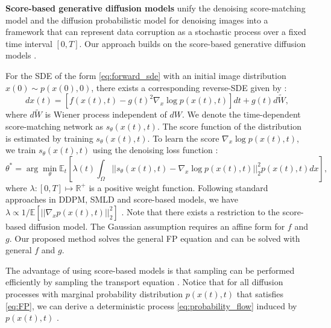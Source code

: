 \documentclass[]{interact}
\theoremstyle{plain}%
\theoremstyle{definition}
\theoremstyle{remark}
\begin{document}
\textbf{Score-based generative diffusion models} unify the denoising score-matching model \cite{ysong-2020, ysong-2020-2} and the diffusion probabilistic model for denoising images \cite{ho-2020, sohl-dickstein-2015} into a framework that can represent data corruption as a stochastic process over a fixed time interval $[0, T]$. Our approach builds on the score-based generative diffusion models \cite{ysong-2020}. 

For the SDE of the form \eqref{eq:forward_sde} with an initial image distribution $x(0) \sim p(x(0),0)$,  there exists a corresponding reverse-SDE given by \cite{anderson-1982}:
\begin{equation}
    dx(t) = [f(x(t),t) - g(t)^2\nabla_x \log p(x(t),t)]dt + g(t)d\tilde{W},
    \label{eq:reverse_diffusion}
\end{equation}
where $d\tilde{W}$ is Wiener process independent of $dW$. We denote the time-dependent score-matching network as $s_{\theta}(x(t),t)$. The score function of the distribution is estimated by training $s_\theta(x(t),t)$. To learn the score $\nabla_{x}\log p(x(t),t)$, we train $s_{\theta}(x(t),t)$ using the denoising loss function \cite{ysong-2020}:
\begin{equation}
    \theta^* = \arg\min\limits_{\theta} \mathbb{E}_{t}[\lambda(t) \int_{\Omega}||s_{\theta}(x(t),t) - \nabla_{x}\log p(x(t),t)||_2^2 p(x(t),t)dx],
\end{equation}
where $\lambda: [0,T] \mapsto \mathbb{R}^{+}$ is a positive weight function. Following standard approaches in DDPM, SMLD and score-based models, we have $\lambda \propto 1/\mathbb{E}[||\nabla_x p(x(t),t)||_2^2]$ \cite{ho-2020, ysong-2020-2}. Note that there exists a restriction to the score-based diffusion model. The Gaussian assumption requires an affine form for $f$ and $g$. Our proposed method solves the general FP equation and can be solved with general $f$ and $g$.

The advantage of using score-based models is that sampling can be performed efficiently by sampling the transport equation \cite{boffi-2022}. Notice that for all diffusion processes with marginal probability distribution $p(x(t),t)$ that satisfies \eqref{eq:FP}, we can derive a deterministic process \eqref{eq:probability_flow} induced by $p(x(t), t)$ \cite{ysong-2020}.
\end{document}
